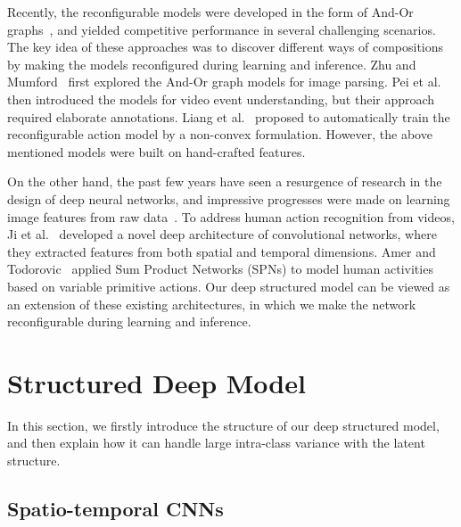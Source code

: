\documentclass{sig-alternate}
\begin{document}
Recently, the reconfigurable models were developed in the form of And-Or graphs~\cite{AOGZhu2006,AOGICCV2011,LiangMM2013,JVTPMM14,AOGCVPR2013}, and yielded competitive performance in several challenging scenarios. The key idea of these approaches was to discover different ways of compositions by making the models reconfigured during learning and inference. Zhu and Mumford~\cite{AOGZhu2006} first explored the And-Or graph models for image parsing. Pei et al.~\cite{AOGICCV2011} then introduced the models for video event understanding, but their approach required elaborate annotations. Liang et al.~\cite{LiangMM2013} proposed to automatically train the reconfigurable action model by a non-convex formulation. However, the above mentioned models were built on hand-crafted features.

On the other hand, the past few years have seen a resurgence of research in the design of deep neural networks, and impressive progresses were made on learning image features from raw data~\cite{Hinton06,LeCunECCV2010,AndrewNgCVPR2011, ImagenetNIPS2012, DSPACV13, rbgCVPR2014}. To address human action recognition from videos, Ji et al.~\cite{3DCNNPAMI} developed a novel deep architecture of convolutional networks, where they extracted features from both spatial and temporal dimensions. Amer and Todorovic~\cite{SinisaSPNCVPR2012} applied Sum Product Networks (SPNs) to model human activities based on variable primitive actions. Our deep structured model can be viewed as an extension of these existing architectures, in which we make the network reconfigurable during learning and inference.


\section{Structured Deep Model}


In this section, we firstly introduce the structure of our deep structured model, and then explain how it can handle large intra-class variance with the latent structure.

\vspace{3mm}
\subsection{Spatio-temporal CNNs}
\end{document}
